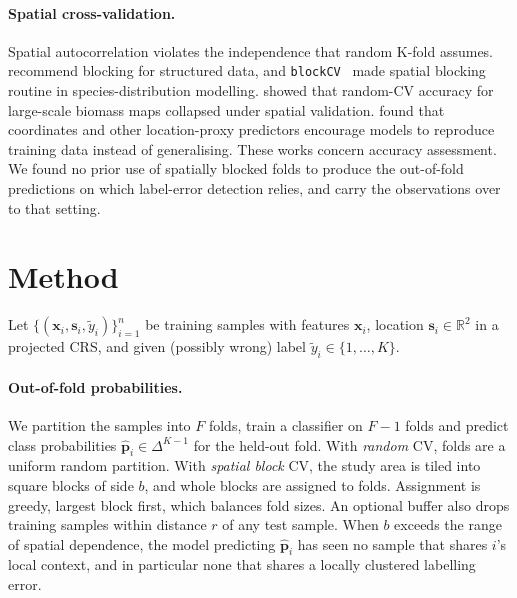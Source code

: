 \documentclass[11pt]{article}
\begin{document}
\paragraph{Spatial cross-validation.}
Spatial autocorrelation violates the independence that random K-fold assumes.
\citet{roberts2017cross} recommend blocking for structured data, and
\texttt{blockCV}~\citep{valavi2019blockcv} made spatial blocking routine in
species-distribution modelling. \citet{ploton2020spatial} showed that
random-CV accuracy for large-scale biomass maps collapsed under spatial
validation. \citet{meyer2019importance} found that coordinates and other
location-proxy predictors encourage models to reproduce training data instead of
generalising. These works concern accuracy assessment. We found no prior use of
spatially blocked folds to produce the out-of-fold predictions on which
label-error detection relies, and carry the observations over to that setting.

\section{Method}
\label{sec:method}

Let $\{(\mathbf{x}_i, \mathbf{s}_i, \tilde y_i)\}_{i=1}^n$ be training samples
with features $\mathbf{x}_i$, location $\mathbf{s}_i \in \mathbb{R}^2$ in a
projected CRS, and given (possibly wrong) label $\tilde y_i \in \{1,\dots,K\}$.

\paragraph{Out-of-fold probabilities.}
We partition the samples into $F$ folds, train a classifier on $F-1$ folds and
predict class probabilities $\hat{\mathbf{p}}_i \in \Delta^{K-1}$ for the
held-out fold. With \emph{random} CV, folds are a uniform random partition. With
\emph{spatial block} CV, the study area is tiled into square blocks of side $b$,
and whole blocks are assigned to folds. Assignment is greedy, largest block first,
which balances fold sizes. An optional buffer also drops training samples within
distance $r$ of any test sample. When $b$ exceeds the range of spatial
dependence, the model predicting $\hat{\mathbf{p}}_i$ has seen no sample that
shares $i$'s local context, and in particular none that shares a locally clustered
labelling error.
\end{document}
